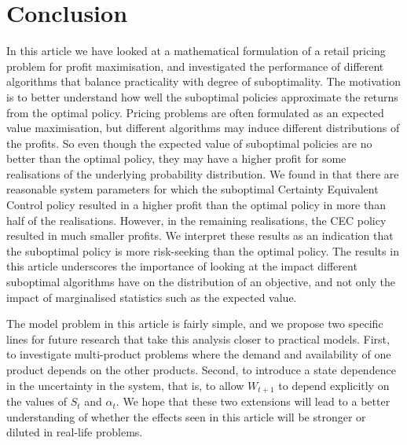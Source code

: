 \documentclass[main.tex]{subfiles}
\begin{document}
\listoftodos

\section{Conclusion}\label{sec:conclusion}
In this article we have looked at a mathematical formulation of a
retail pricing problem for profit maximisation, and investigated the
performance of different algorithms that balance practicality
with degree of suboptimality. The motivation is to better understand
how well the suboptimal policies approximate the returns from the
optimal policy.
Pricing problems are often formulated as an expected value
maximisation, but different algorithms may induce different
distributions of the profits.
So even though the expected value of suboptimal policies are no better
than the optimal policy, they may have a higher profit for some
realisations of the underlying probability distribution.
We found in  that there are
reasonable system parameters for which
the suboptimal Certainty Equivalent Control policy resulted in a higher profit
than the optimal policy in more than half of the realisations.
However, in the remaining realisations, the CEC policy resulted in
much smaller profits. We interpret these results as an indication that
the suboptimal policy is more risk-seeking than the optimal policy.
The results in this article underscores the importance of looking at the impact
different suboptimal algorithms have on the distribution of
an objective, and not only the impact of
marginalised statistics such as the expected value.

The model problem in this article is fairly simple, and
we propose two specific lines for future research that
take this analysis closer to practical models.
First, to investigate multi-product problems where the demand and
availability of one product depends on the other products.
Second, to introduce a state dependence in the uncertainty in the
system, that is, to allow $W_{t+1}$ to depend explicitly on the values
of $S_t$ and $\alpha_t$.
We hope that these two extensions will lead to a better understanding of
whether the effects seen in this article will be stronger or diluted
in real-life problems.

\biblio
\end{document}
